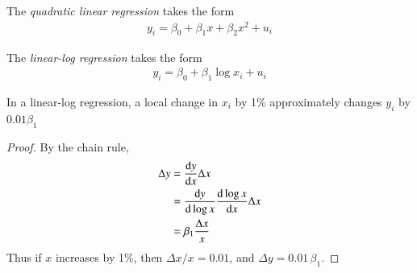            \begin{definition}
                The \textit{quadratic linear regression} takes the form
                \begin{align}
                    y_i = \beta_0 + \beta_1 x + \beta_2 x^2 + u_i
                \end{align}
            \end{definition}


            \begin{definition}
                The \textit{linear-log regression} takes the form
                \begin{align}
                    y_i = \beta_0 + \beta_1 \log x_i + u_i
                \end{align}
            \end{definition}
            \begin{lemma}
                In a linear-log regression, a local change in $x_i$ by 1\% approximately changes $y_i$ by $0.01\beta_1$
            \end{lemma}
            \begin{proof}
                By the chain rule, 
                \begin{align*}
                    \Delta y
                        &= \odv{y}{x}\Delta x \\
                        &= \odv{y}{\log x}\odv{\log x}{x}\Delta x\\  
                        &= \beta_1\frac{\Delta x}{x}    
                \end{align*}
                Thus if $x$ increases by 1\%, then $\Delta x/x = 0.01$, and $\Delta y = 0.01\,\beta_1$.
            \end{proof}
            
